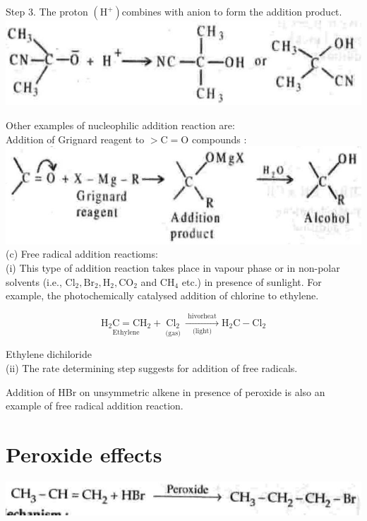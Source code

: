 \documentclass[10pt]{article}
\begin{document}
Step 3. The proton $\left(\mathrm{H}^{+}\right)$combines with anion to form the addition product.\\
\includegraphics[max width=\textwidth, center]{2025_01_28_8470952b98110cec3aabg-098(4)}

Other examples of nucleophilic addition reaction are:\\
Addition of Grignard reagent to $>\mathrm{C}=\mathrm{O}$ compounds :\\
\includegraphics[max width=\textwidth, center]{2025_01_28_8470952b98110cec3aabg-098(2)}\\
(c) Free radical addition reactioms:\\
(i) This type of addition reaction takes place in vapour phase or in non-polar solvents (i.e., $\mathrm{Cl}_{2}, \mathrm{Br}_{2}, \mathrm{H}_{2}, \mathrm{CO}_{2}$ and $\mathrm{CH}_{4}$ etc.) in presence of sunlight. For example, the photochemically catalysed addition of chlorine to ethylene.

$$
\underset{\text { Ethylene }}{\mathrm{H}_{2} \mathrm{C}=\mathrm{CH}_{2}}+\underset{\text { (gas) }}{\mathrm{Cl}_{2}} \xrightarrow[\text { (light) }]{\text { hivorheat }} \mathrm{H}_{2} \mathrm{C}-\mathrm{Cl}_{2}
$$

Ethylene dichiloride\\
(ii) The rate determining step suggests for addition of free radicals.

Addition of HBr on unsymmetric alkene in presence of peroxide is also an example of free radical addition reaction.

\section*{Peroxide effects}
\begin{center}
\includegraphics[max width=\textwidth]{2025_01_28_8470952b98110cec3aabg-098(1)}
\end{center}
\end{document}
